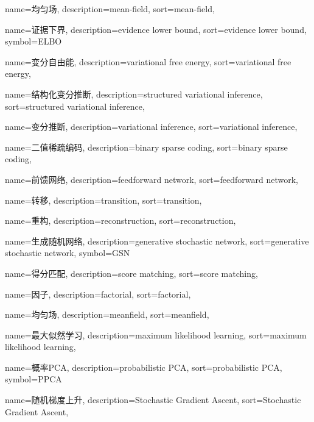 {
  name=均匀场,
  description={mean-field},
  sort={mean-field},
}

{
  name=证据下界,
  description={evidence lower bound},
  sort={evidence lower bound},
  symbol={ELBO}
}

{
  name=变分自由能,
  description={variational free energy},
  sort={variational free energy},
}

{
  name=结构化变分推断,
  description={structured variational inference},
  sort={structured variational inference},
}

{
  name=变分推断,
  description={variational inference},
  sort={variational inference},
}

{
  name=二值稀疏编码,
  description={binary sparse coding},
  sort={binary sparse coding},
}

{
  name=前馈网络,
  description={feedforward network},
  sort={feedforward network},
}

{
  name=转移,
  description={transition},
  sort={transition},
}

{
  name=重构,
  description={reconstruction},
  sort={reconstruction},
}

{
  name=生成随机网络,
  description={generative stochastic network},
  sort={generative stochastic network},
  symbol={GSN}
}

{
  name=得分匹配,
  description={score matching},
  sort={score matching},
}

{
  name=因子,
  description={factorial},
  sort={factorial},
}

{
  name=均匀场,
  description={meanfield},
  sort={meanfield},
}

{
  name=最大似然学习,
  description={maximum likelihood learning},
  sort={maximum likelihood learning},
}

{
  name=概率PCA,
  description={probabilistic PCA},
  sort={probabilistic PCA},
  symbol={PPCA}
}

{
  name=随机梯度上升,
  description={Stochastic Gradient Ascent},
  sort={Stochastic Gradient Ascent},
}


